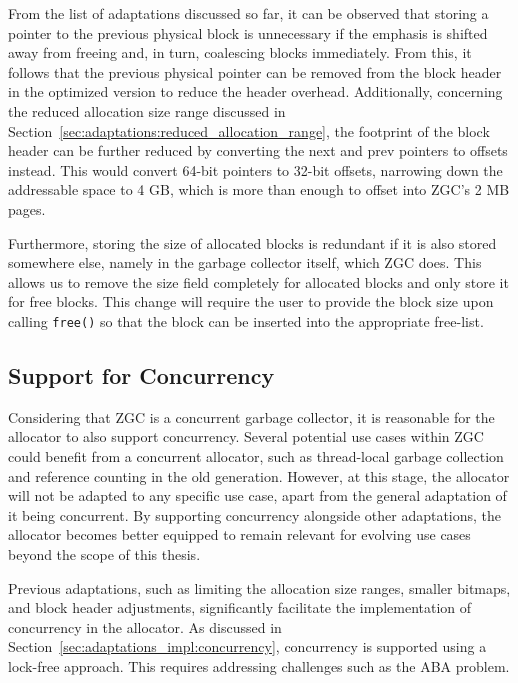From the list of adaptations discussed so far, it can be observed that storing a pointer to the previous physical block is unnecessary if the emphasis is shifted away from freeing and, in turn, coalescing blocks immediately. From this, it follows that the previous physical pointer can be removed from the block header in the optimized version to reduce the header overhead. Additionally, concerning the reduced allocation size range discussed in Section~\ref{sec:adaptations:reduced_allocation_range}, the footprint of the block header can be further reduced by converting the next and prev pointers to offsets instead. This would convert 64-bit pointers to 32-bit offsets, narrowing down the addressable space to 4 GB, which is more than enough to offset into ZGC's 2 MB pages.

Furthermore, storing the size of allocated blocks is redundant if it is also stored somewhere else, namely in the garbage collector itself, which ZGC does. This allows us to remove the size field completely for allocated blocks and only store it for free blocks. This change will require the user to provide the block size upon calling \texttt{free()} so that the block can be inserted into the appropriate free-list.

\subsection{Support for Concurrency}

Considering that ZGC is a concurrent garbage collector, it is reasonable for the allocator to also support concurrency. Several potential use cases within ZGC could benefit from a concurrent allocator, such as thread-local garbage collection and reference counting in the old generation. However, at this stage, the allocator will not be adapted to any specific use case, apart from the general adaptation of it being concurrent. By supporting concurrency alongside other adaptations, the allocator becomes better equipped to remain relevant for evolving use cases beyond the scope of this thesis.

Previous adaptations, such as limiting the allocation size ranges, smaller bitmaps, and block header adjustments, significantly facilitate the implementation of concurrency in the allocator. As discussed in Section~\ref{sec:adaptations_impl:concurrency}, concurrency is supported using a lock-free approach. This requires addressing challenges such as the ABA problem.

